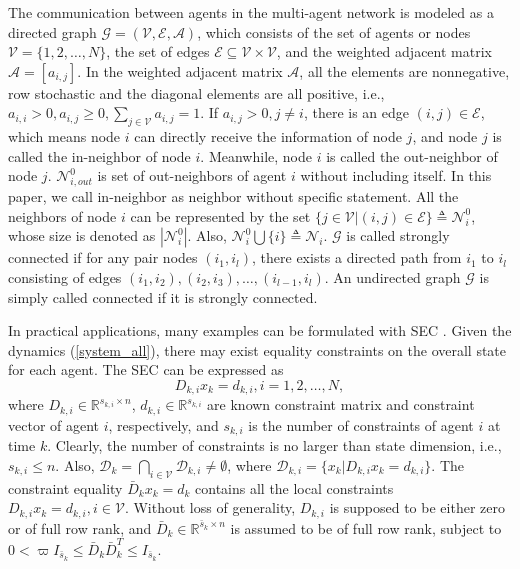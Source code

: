 \documentclass[journal,transmag]{IEEEtran}
\begin{document}
	The communication between agents in the multi-agent network is modeled as a directed graph $\mathcal{G=(V,E,A)}$, which consists of  the set of agents or nodes $\mathcal{V}=\{1,2,\ldots,N\}$, the set of edges $\mathcal{E}\subseteq \mathcal{V}\times \mathcal{V}$, and the weighted adjacent matrix $\mathcal{A}=[a_{i,j}]$.  In the weighted adjacent matrix $\mathcal{A}$, all the elements are nonnegative, row stochastic and the diagonal elements are all positive, i.e., $a_{i,i}> 0,a_{i,j}\geq 0,\sum_{j\in \mathcal{V}}a_{i,j}=1$. If $a_{i,j}>0,j\neq i$, there is an edge $(i,j)\in \mathcal{E}$, which means node $i$ can directly receive the information of node $j$, and node $j$ is called the in-neighbor of node $i$. Meanwhile, node $i$ is called the out-neighbor of node $j$. 
	$\mathcal{N}_{i,out}^0$ is set of out-neighbors of agent $i$ without including itself. In this paper, we call in-neighbor as neighbor without specific statement.	
	All the neighbors of node $i$ can be represented by the set $\{j\in\mathcal{V}|(i,j)\in \mathcal{E}\}\triangleq\mathcal{N}_{i}^0$, whose size  is denoted as $|\mathcal{N}_{i}^0|$. 
	Also, $\mathcal{N}_{i}^0\bigcup\{i\}\triangleq \mathcal{N}_{i}$. $\mathcal{G}$ is called strongly connected if for any pair nodes $(i_{1},i_{l})$, there exists a directed path from $i_{1}$ to $i_{l}$ consisting of edges $(i_{1},i_{2}),(i_{2},i_{3}),\ldots,(i_{l-1},i_{l})$. An undirected graph $\mathcal{G}$ is simply called connected if it is strongly connected.
	
	
	
	

	
	
	
		{In practical applications, many examples can be formulated with SEC \cite{crassidis2003unscented,Chandrasekar2004State,wen1992model,shen2006reliable,simon2002kalman,rotea2008state}.
	Given the dynamics (\ref{system_all}), there may exist equality constraints on the overall state for each agent. The SEC can be expressed as}	
	\begin{equation}\label{system_constriants}
	D_{k,i}x_{k}=d_{k,i},i=1,2,\ldots,N,
	\end{equation}
	where $D_{k,i}\in\mathbb{R}^{s_{k,i}\times n}$, $d_{k,i}\in\mathbb{R}^{s_{k,i}}$ are known constraint matrix and constraint vector of agent $i$, respectively, and $s_{k,i}$ is the number of constraints of agent $i$ at time $k$.
	Clearly, the number of constraints is no larger than  state dimension, i.e., $s_{k,i}\leq n.$ Also, $\mathcal{D}_{k}=\bigcap_{i\in\mathcal{V}} \mathcal{D}_{k,i}\neq \emptyset$, where $\mathcal{D}_{k,i}=\{x_k|D_{k,i}x_k=d_{k,i}\}$. The constraint equality $\bar D_kx_k=d_k$ contains all the local constraints $D_{k,i}x_k= d_{k,i},i\in\mathcal{V}$.
	{
	Without loss of generality, $D_{k,i}$ is supposed to be either  zero  or of full row  rank, and $\bar D_k\in\mathbb{R}^{\bar s_k\times n}$ is assumed to be of full row rank, subject to $0<\varpi I_{ \bar s_k}\leq \bar D_{k}\bar D_{k}^T\leq I_{\bar s_k}$. }
	
\end{document}
